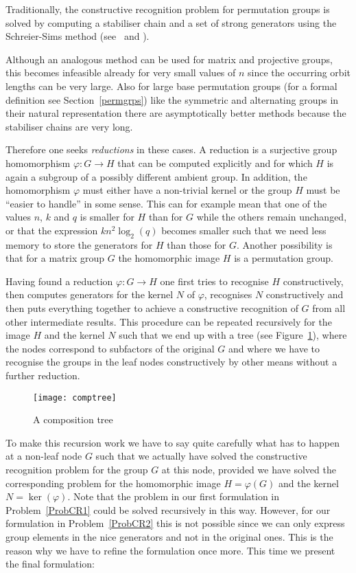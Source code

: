 Traditionally, the constructive recognition problem for permutation
groups is solved by computing a stabiliser chain and a set of strong
generators using the Schreier-Sims method (see~\cite{Si} and \cite{Ser}). 

Although an analogous method can be used for matrix and projective groups,
this becomes infeasible already for very small values of $n$ since the
occurring orbit lengths can be very large. Also for large base permutation
groups (for a formal definition see Section~\ref{permgrps}) like the
symmetric and alternating groups in their natural representation there
are asymptotically better methods because the stabiliser chains are very long.

Therefore one seeks \emph{reductions} in these cases. A reduction is
a surjective group homomorphism $\varphi : G \to H$ that can be computed
explicitly and for which $H$ is again a subgroup of a possibly different
ambient group. In addition, the homomorphism $\varphi$ must either have
a non-trivial kernel or the group $H$ must be ``easier to handle'' in some
sense. This can for example mean that one of the values $n$, $k$ and
$q$ is smaller for $H$ than for $G$ while the others remain unchanged,
or that the expression $kn^2\log_2(q)$ becomes smaller such that we need
less memory to store the generators for $H$ than those for $G$.
Another possibility is that for a matrix group $G$ the homomorphic image
$H$ is a permutation group.

Having found a reduction $\varphi : G \to H$ one first tries to recognise
$H$ constructively, then computes generators for the kernel $N$ of
$\varphi$, recognises $N$ constructively and then puts everything together
to achieve a constructive recognition of $G$ from all other intermediate
results. This procedure can be repeated recursively for the image $H$ and
the kernel $N$ such that we end up with a tree (see
Figure~\ref{comptreefig}), where the nodes correspond
to subfactors of the original $G$ and where we have to recognise
the groups in the leaf nodes constructively by other means without
a further reduction.

\begin{figure}
\begin{center}
\texttt{[image: comptree]}
\end{center}
\caption{A composition tree}
\label{comptreefig}
\end{figure}

To make this recursion work we have to say quite carefully what has to
happen at a non-leaf node $G$ such that we actually have solved the
constructive recognition problem for the group $G$ at this node, provided
we have solved the corresponding problem for the homomorphic image
$H=\varphi(G)$ and the kernel $N = \ker(\varphi)$. Note that the problem
in our first formulation in Problem~\ref{ProbCR1} could be solved
recursively in this way. However, for our formulation in Problem~\ref{ProbCR2}
this is not possible since we can only express group elements in the nice
generators and not in the original ones. This is the reason why we have to
refine the formulation once more. This time we present the final
formulation:


